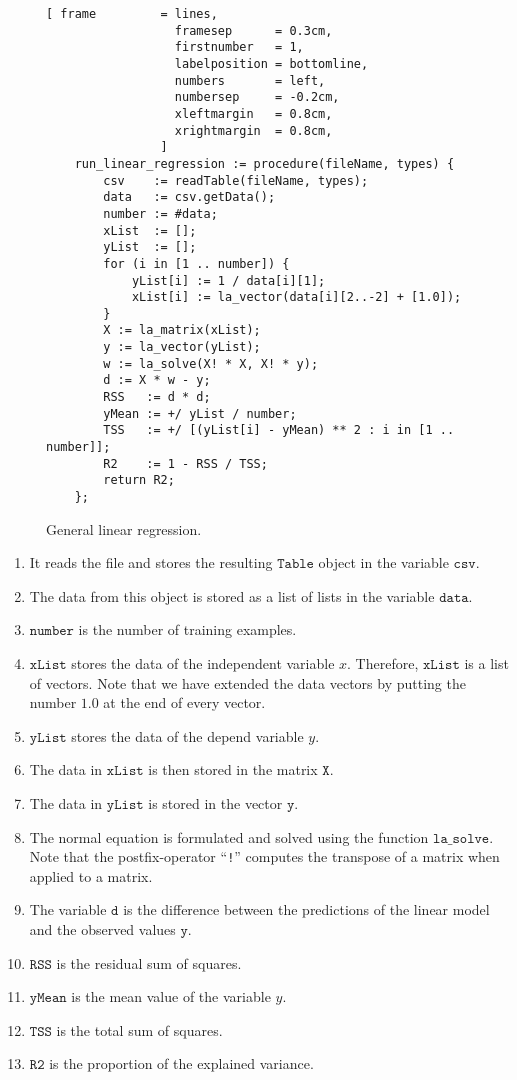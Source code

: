 \begin{figure}[!ht]
\centering
\begin{Verbatim}[ frame         = lines, 
                  framesep      = 0.3cm, 
                  firstnumber   = 1,
                  labelposition = bottomline,
                  numbers       = left,
                  numbersep     = -0.2cm,
                  xleftmargin   = 0.8cm,
                  xrightmargin  = 0.8cm,
                ]
    run_linear_regression := procedure(fileName, types) {
        csv    := readTable(fileName, types);
        data   := csv.getData();
        number := #data;
        xList  := [];
        yList  := [];
        for (i in [1 .. number]) {
            yList[i] := 1 / data[i][1];
            xList[i] := la_vector(data[i][2..-2] + [1.0]);
        }
        X := la_matrix(xList);
        y := la_vector(yList);
        w := la_solve(X! * X, X! * y);
        d := X * w - y;
        RSS   := d * d;
        yMean := +/ yList / number;
        TSS   := +/ [(yList[i] - yMean) ** 2 : i in [1 .. number]];
        R2    := 1 - RSS / TSS;
        return R2;
    };
\end{Verbatim}
\vspace*{-0.3cm}
\caption{General linear regression.}
\label{fig:linear-regression.stlx}
\end{figure}
\begin{enumerate}
\item It reads the file and stores the resulting $\mathtt{Table}$ object in the variable $\mathtt{csv}$.
\item The data from this object is stored as a list of lists in the variable $\mathtt{data}$.
\item $\mathtt{number}$ is the number of training examples.
\item $\mathtt{xList}$ stores the data of the independent variable $x$.  Therefore, $\mathtt{xList}$ is a list
      of vectors.  Note that we have extended the data vectors by putting the number $1.0$ at the end of every vector.  
\item $\mathtt{yList}$ stores the data of the depend variable $y$.
\item The data in $\mathtt{xList}$ is then stored in the matrix $\mathtt{X}$.  
\item The data in $\mathtt{yList}$ is stored in the vector $\mathtt{y}$.
\item The normal equation is formulated and solved using the function $\mathtt{la\_solve}$.
      Note that the postfix-operator ``\texttt{!}'' computes the transpose of a matrix when applied to a matrix.
\item The variable $\mathtt{d}$ is the difference between the predictions of the linear model and the observed
      values $\mathtt{y}$.
\item $\mathtt{RSS}$ is the residual sum of squares.
\item $\mathtt{yMean}$ is the mean value of the variable $y$.
\item $\mathtt{TSS}$ is the total sum of squares.
\item $\mathtt{R2}$ is the proportion of the explained variance.
\end{enumerate}



